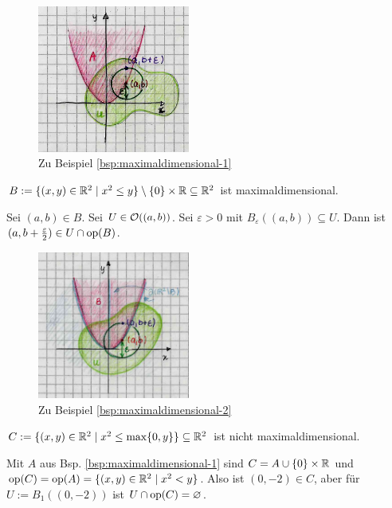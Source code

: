     
    \begin{figure}[ht]
        \centering
        \includegraphics[width=5cm]{abb/maxdim-1.png}
        \caption{Zu Beispiel \ref{bsp:maximaldimensional-1}}
        \label{fig:maxdim-1}
    \end{figure}

    \begin{bsp}\label{bsp:maximaldimensional-2}
        $B := \{(x,y) \in \mathbb{R}^2 \mid x^2 \leq y\} \setminus \{0\} \times \mathbb{R} \subseteq \mathbb{R}^2$ ist maximaldimensional.
    \end{bsp}
    \begin{bew}
        Sei $(a,b) \in B$. Sei $U \in \mathcal{O}((a,b))$. Sei $\varepsilon > 0$ mit $B_\varepsilon((a,b)) \subseteq U$. Dann ist $(a,b+\frac{\varepsilon}{2}) \in U \cap \text{op}(B)$.
    \end{bew}

    
    \begin{figure}[ht]
        \centering
        \includegraphics[width=5cm]{abb/maxdim-2.png}
        \caption{Zu Beispiel \ref{bsp:maximaldimensional-2}}
        \label{fig:maxdim-2}
    \end{figure}

    \begin{gegenbsp}\label{gegenbsp:maximaldimensional}
        $C := \{(x,y) \in \mathbb{R}^2 \mid x^2 \leq \max\{0,y\}\} \subseteq \mathbb{R}^2$ ist nicht maximaldimensional.
    \end{gegenbsp}
    \begin{bew}
        Mit $A$ aus Bsp. \ref{bsp:maximaldimensional-1} sind $C = A \cup \{0\} \times \mathbb{R}$ und $\text{op}(C) = \text{op}(A) = \{(x,y) \in \mathbb{R}^2 \mid x^2 < y\}$. Also ist $(0,-2) \in C$, aber für $U := B_1((0,-2))$ ist $U \cap \text{op}(C) = \varnothing$.
    \end{bew}

